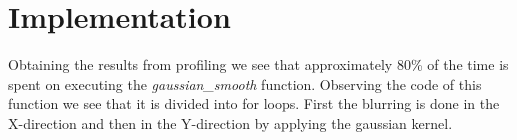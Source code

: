 \section{Implementation}
Obtaining the results from profiling we see that approximately 80\% of the time is spent on executing the \textit{gaussian_smooth} function. Observing the code of this function we see that it is divided into for loops. First the blurring is done in the X-direction and then in the Y-direction by applying the gaussian kernel. 



